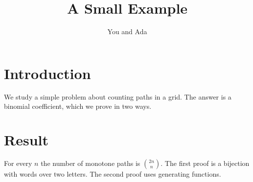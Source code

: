 \documentclass{article}
\title{A Small Example}
\author{You and Ada}
\begin{document}
\maketitle

\section{Introduction}
We study a simple problem about counting paths in a grid.
The answer is a binomial coefficient, which we prove in two ways.

\section{Result}
For every $n$ the number of monotone paths is $\binom{2n}{n}$.
The first proof is a bijection with words over two letters.
The second proof uses generating functions.
\end{document}
